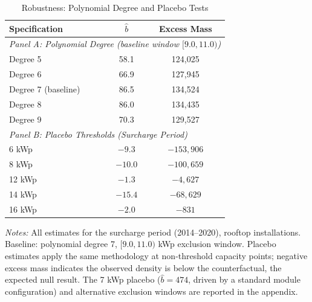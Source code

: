 \begin{table}[t]
\centering
\caption{Robustness: Polynomial Degree and Placebo Tests}
\label{tab:robustness}
\begin{tabular}{lcc}
\toprule
Specification & $\hat{b}$ & Excess Mass \\
\midrule
\multicolumn{3}{l}{\textit{Panel A: Polynomial Degree (baseline window $[9.0, 11.0)$)}} \\
Degree 5 & 58.1 & 124,025 \\
Degree 6 & 66.9 & 127,945 \\
Degree 7 (baseline) & 86.5 & 134,524 \\
Degree 8 & 86.0 & 134,435 \\
Degree 9 & 70.3 & 129,527 \\
\midrule
\multicolumn{3}{l}{\textit{Panel B: Placebo Thresholds (Surcharge Period)}} \\
6 kWp & $-9.3$ & $-153,906$ \\
8 kWp & $-10.0$ & $-100,659$ \\
12 kWp & $-1.3$ & $-4,627$ \\
14 kWp & $-15.4$ & $-68,629$ \\
16 kWp & $-2.0$ & $-831$ \\
\bottomrule
\end{tabular}

\begin{flushleft}\small \textit{Notes:} All estimates for the surcharge period (2014--2020), rooftop installations. Baseline: polynomial degree 7, $[9.0, 11.0)$ kWp exclusion window. Placebo estimates apply the same methodology at non-threshold capacity points; negative excess mass indicates the observed density is below the counterfactual, the expected null result. The 7 kWp placebo ($\hat{b} = 474$, driven by a standard module configuration) and alternative exclusion windows are reported in the appendix.\end{flushleft}
\end{table}
